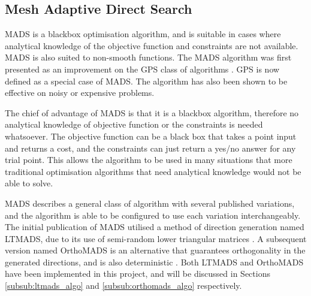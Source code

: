 %
%

\subsection{Mesh Adaptive Direct Search}\label{sub_MADS}
\ac{MADS} is a blackbox optimisation algorithm, and is suitable in cases where analytical knowledge of the objective function and constraints are not available. \ac{MADS} is also suited to non-smooth functions. The \ac{MADS} algorithm \cite{Audet2007MeshOptimization} was first presented as an improvement on the \ac{GPS} class of algorithms \cite{Torczon1997ON}. \ac{GPS} is now defined as a special case of \ac{MADS}. The algorithm has also been shown to be effective on noisy or expensive problems.

The chief of advantage of \ac{MADS} is that it is a blackbox algorithm, therefore no analytical knowledge of objective function or the constraints is needed whatsoever. The objective function can be a black box that takes a point input and returns a cost, and the constraints can just return a yes/no answer for any trial point. This allows the algorithm to be used in many situations that more traditional optimisation algorithms that need analytical knowledge would not be able to solve.

\ac{MADS} describes a general class of algorithm with several published variations, and the algorithm is able to be configured to use each variation interchangeably. The initial publication of \ac{MADS} utilised a method of direction generation named \ac{LTMADS}, due to its use of semi-random lower triangular matrices \cite{Audet2007MeshOptimization}. A subsequent version named \ac{OrthoMADS} is an alternative that guarantees orthogonality in the generated directions, and is also deterministic \cite{Abramson2009Orthomads:Ions}. Both \ac{LTMADS} and \ac{OrthoMADS} have been implemented in this project, and will be discussed in Sections \ref{subsub:ltmads_algo} and \ref{subsub:orthomads_algo} respectively.

